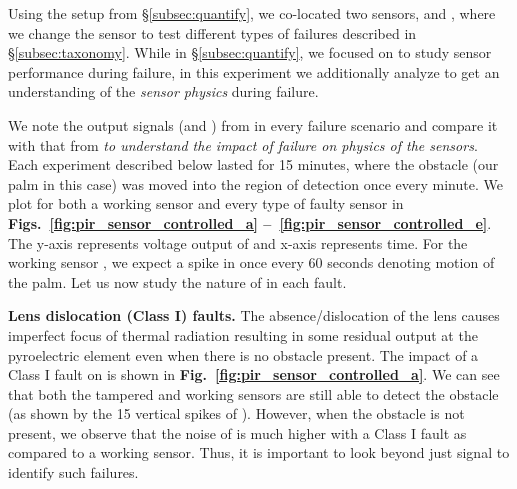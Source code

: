 Using the setup from {\S\ref{subsec:quantify}}, we co-located two sensors, \tampered and \working, where we change the \tampered sensor to test different types of failures described in \S\ref{subsec:taxonomy}. While in \S\ref{subsec:quantify}, we focused on \cout to study sensor performance during failure, in this experiment we additionally analyze \aout to get an understanding of the \textit{sensor physics} during failure.
%
%

We note the output signals (\ie \aout and \cout) from \tampered in every failure scenario and compare it with that from \working \emph{to understand the impact of failure on physics of the sensors}. Each experiment described below lasted for 15 minutes, where the obstacle (our palm in this case) was moved into the region of detection once every minute. We plot \aout for both a working sensor and every type of faulty sensor in {\bfseries Figs.~\ref{fig:pir_sensor_controlled_a} --~\ref{fig:pir_sensor_controlled_e}}. The y-axis represents voltage output of \aout and x-axis represents time. %
For the working sensor \working, we expect a spike in \aout once every 60 seconds denoting motion of the palm. Let us now study the nature of \aout in each fault.

\textbf{Lens dislocation (Class I) faults.} The absence/dislocation of the lens causes imperfect focus of thermal radiation resulting in some residual output at the pyroelectric element even when there is no obstacle present. The impact of a Class I fault on \aout is shown in \textbf{Fig.~\ref{fig:pir_sensor_controlled_a}}. 
We can see that both the tampered and working sensors are still able to detect the obstacle (as shown by the 15 vertical spikes of \aout). However, when the obstacle is not present, we observe that the noise of \aout is much higher with a Class I fault as compared to a working sensor. Thus, it is important to look beyond just \cout signal to identify such failures.

